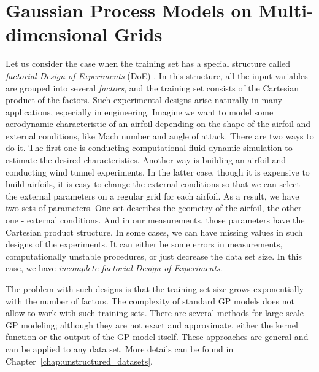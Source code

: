 \chapter{Gaussian Process Models on Multi-dimensional Grids}
\label{chap:gp_on_grids}




Let us consider the case when the training set has a special structure
called {\em factorial Design of Experiments} (DoE) \citep{Montgomery2006DAE}.
In this structure, all the input variables are grouped into several {\em factors},
and the training set consists of the Cartesian product of the factors.
Such experimental designs arise naturally in many applications, especially in engineering.
Imagine we want to model some aerodynamic characteristic of an airfoil depending
on the shape of the airfoil and external conditions, like Mach number and angle of attack.
There are two ways to do it.
The first one is conducting computational fluid dynamic simulation to estimate
the desired characteristics.
Another way is building an airfoil and conducting wind tunnel experiments.
In the latter case, though it is expensive to build airfoils, it is easy to change the external
conditions so that we can select the external parameters on a regular grid
for each airfoil.
As a result, we have two sets of parameters.
One set describes the geometry of the airfoil, the other one - external conditions.
And in our measurements, those parameters have the Cartesian product structure.
In some cases, we can have missing values in such designs of the experiments.
It can either be some errors in measurements, computationally unstable procedures,
or just decrease the data set size.
In this case, we have {\em incomplete factorial Design of Experiments}.

The problem with such designs is that the training set size grows exponentially
with the number of factors.
The complexity of standard GP models does not allow to work with such training sets.
There are several methods for large-scale GP modeling; although they are not exact
and approximate, either the kernel function or the output of the GP model itself.
These approaches are general and can be applied to any data set.
More details can be found in Chapter~\ref{chap:unstructured_datasets}.

